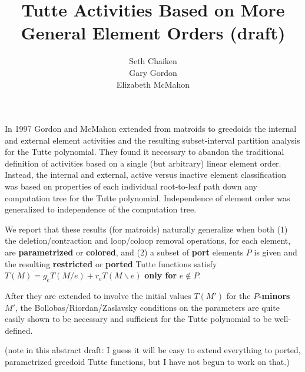 \documentclass{article}
\title{Tutte Activities Based on More General Element Orders (draft)}
\author{Seth Chaiken\\
Gary Gordon\\
Elizabeth McMahon}
\begin{document}
\maketitle
In 1997 Gordon and McMahon\cite{GordonMcMachonGreedoid} 
extended from matroids to greedoids
the internal and external 
element activities and the resulting subset-interval 
partition analysis for the Tutte polynomial.  They found it necessary
to abandon the traditional definition of activities based on a 
single (but arbitrary) linear element order.  Instead, the internal and 
external, active versus inactive element classification was based on 
properties of each individual root-to-leaf path down any computation tree
for the Tutte polynomial.  Independence of element order was generalized to
independence of the computation tree.

We report that these results (for matroids) naturally generalize when both (1) 
the deletion/contraction and loop/coloop removal operations, for each element,
are \textbf{parametrized} or 
\textbf{colored}, and (2) a subset of \textbf{port} elements 
$P$ is given and the resulting \textbf{restricted} or \textbf{ported}
Tutte functions satisfy $T(M) = g_e T(M/e) + r_e T(M\backslash e)$ 
\textbf{only for} $e\not\in P$.

After they are extended to involve the initial values $T(M')$ for 
the \textbf{$P$-minors} $M'$, the Bollobas/Riordan/Zaslavsky 
conditions on the parameters are quite easily 
shown to be necessary and sufficient for the Tutte polynomial to be
well-defined.

(note in this abstract draft: I guess it will be easy to extend everything
to ported, parametrized greedoid Tutte functions, but I have not 
begun to work on that.)




\end{document}
